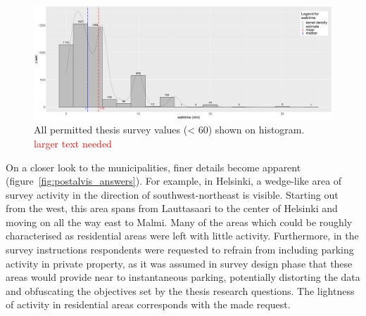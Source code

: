 \begin{figure}[H]%
    \centering
    \includegraphics[width=\textwidth]{images/hist_pmax59-wmax59_walktime-likert_binw2_23-09-2020.png}
    \caption[Histogram, walk to destination]{All permitted thesis survey  values (< 60) shown on histogram. \textcolor{red}{larger text needed}}%
    \label{fig:walktime_hist}%
\end{figure}

On a closer look to the municipalities, finer details become apparent (figure~\ref{fig:postalvis_answers}). For example, in Helsinki, a wedge-like area of survey activity in the direction of southwest-northeast is visible. Starting out from the west, this area spans from Lauttasaari to the center of Helsinki and moving on all the way east to Malmi. Many of the areas which could be roughly characterised as residential areas were left with little activity. Furthermore, in the survey instructions respondents were requested to refrain from including parking activity in private property, as it was assumed in survey design phase that these areas would provide near to instantaneous parking, potentially distorting the data and obfuscating the objectives set by the thesis research questions. The lightness of activity in residential areas corresponds with the made request.

